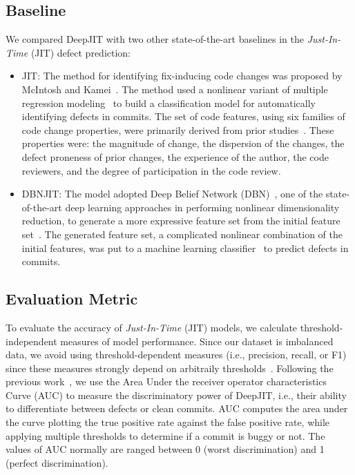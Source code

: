 \subsection{Baseline}
\label{sec:baseline}
We compared DeepJIT with two other state-of-the-art baselines in the \emph{Just-In-Time} (JIT) defect prediction:
\begin{itemize}
\item JIT: The method for identifying fix-inducing code changes was proposed by McIntosh and Kamei~\cite{mcintosh2018fix}. The method used a nonlinear variant of multiple regression modeling~\cite{fox1997applied} to build a classification model for automatically identifying defects in commits. The set of code features, using six families of code change properties, were primarily derived from prior studies~\cite{Kamei:2013:LES, Kim:2008:CSC, Kononenko:2015, Mockus2000}. These properties were: the magnitude of change, the dispersion of the changes, the defect proneness of prior changes, the experience of the author, the code reviewers, and the degree of participation in the code review. 
\item DBNJIT: The model adopted Deep Belief Network (DBN)~\cite{hinton2006reducing}, one of the state-of-the-art deep learning approaches in performing nonlinear dimensionality reduction, to generate a more expressive feature set from the initial feature set~\cite{Yang:2015:DLJ}. The generated feature set, a complicated nonlinear combination of the initial features, was put to a machine learning classifier~\cite{nasrabadi2007pattern} to predict defects in commits. 
\end{itemize}

\subsection{Evaluation Metric}
\label{sec:metric}
To evaluate the accuracy of \emph{Just-In-Time} (JIT) models, we calculate  threshold-independent measures of model performance. Since our dataset is imbalanced data, we avoid using threshold-dependent measures (i.e., precision, recall, or F1) since these measures strongly depend on arbitraily thresholds~\cite{nguyen2009learning, gu2008data}. Following the previous work~\cite{mcintosh2018fix},  we use the Area Under the receiver operator characteristics
Curve (AUC) to measure the discriminatory power of DeepJIT, i.e., their ability to differentiate between defects or clean commits. AUC computes the area under the curve plotting the true positive rate against the false positive rate, while applying multiple thresholds to determine if a commit is buggy or not. The values of AUC normally are ranged between 0 (worst discrimination) and 1 (perfect discrimination).

